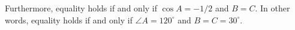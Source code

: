 \documentclass{article}
\begin{document}
Furthermore, equality holds if and only if $\cos A = -1/2$ and $B = C$. In other words, equality holds if and only if $\angle A = 120^\circ$ and $B = C = 30^\circ$.

%
%
%
%
\end{document}

